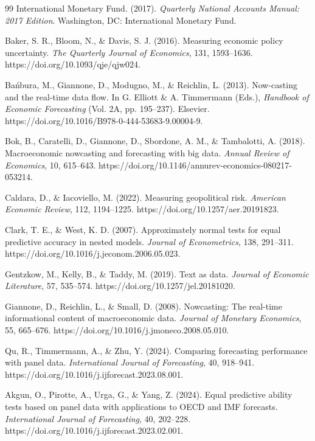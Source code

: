 \documentclass[preprint,12pt,authoryear]{elsarticle}
\begin{document}
\begin{thebibliography}{99}
International Monetary Fund. (2017). \emph{Quarterly National Accounts
Manual: 2017 Edition}. Washington, DC: International Monetary Fund.

Baker, S. R., Bloom, N., \& Davis, S. J. (2016). Measuring economic policy
uncertainty. \emph{The Quarterly Journal of Economics}, 131, 1593--1636.
https://doi.org/10.1093/qje/qjw024.

Ba{\'n}bura, M., Giannone, D., Modugno, M., \& Reichlin, L. (2013).
Now-casting and the real-time data flow. In G. Elliott \& A. Timmermann
(Eds.), \emph{Handbook of Economic Forecasting} (Vol. 2A, pp. 195--237).
Elsevier. https://doi.org/10.1016/B978-0-444-53683-9.00004-9.

Bok, B., Caratelli, D., Giannone, D., Sbordone, A. M., \& Tambalotti, A.
(2018). Macroeconomic nowcasting and forecasting with big data. \emph{Annual
Review of Economics}, 10, 615--643.
https://doi.org/10.1146/annurev-economics-080217-053214.

Caldara, D., \& Iacoviello, M. (2022). Measuring geopolitical risk.
\emph{American Economic Review}, 112, 1194--1225.
https://doi.org/10.1257/aer.20191823.

Clark, T. E., \& West, K. D. (2007). Approximately normal tests for equal
predictive accuracy in nested models. \emph{Journal of Econometrics}, 138,
291--311. https://doi.org/10.1016/j.jeconom.2006.05.023.

Gentzkow, M., Kelly, B., \& Taddy, M. (2019). Text as data. \emph{Journal of
Economic Literature}, 57, 535--574.
https://doi.org/10.1257/jel.20181020.

Giannone, D., Reichlin, L., \& Small, D. (2008). Nowcasting: The real-time
informational content of macroeconomic data. \emph{Journal of Monetary
Economics}, 55, 665--676.
https://doi.org/10.1016/j.jmoneco.2008.05.010.

Qu, R., Timmermann, A., \& Zhu, Y. (2024). Comparing forecasting performance
with panel data. \emph{International Journal of Forecasting}, 40, 918--941.
https://doi.org/10.1016/j.ijforecast.2023.08.001.

Akgun, O., Pirotte, A., Urga, G., \& Yang, Z. (2024). Equal predictive ability
tests based on panel data with applications to OECD and IMF forecasts.
\emph{International Journal of Forecasting}, 40, 202--228.
https://doi.org/10.1016/j.ijforecast.2023.02.001.


\end{thebibliography}
\end{document}
